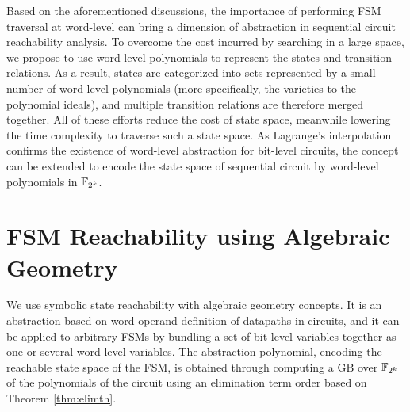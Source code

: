 Based on the aforementioned discussions, the importance of performing FSM traversal at word-level 
can bring a dimension of abstraction in sequential circuit reachability analysis.
To overcome the cost incurred by searching in a large space, we propose to use word-level 
polynomials to represent the states and transition relations. As a result, states are categorized into 
sets represented by a small number of word-level polynomials (more specifically, the varieties to the polynomial ideals),
and multiple transition relations are therefore merged together. All of these efforts reduce the cost of 
state space, meanwhile lowering the time complexity to traverse such a state space. As Lagrange's interpolation
confirms the existence of word-level abstraction for bit-level circuits, the concept
can be extended to encode the state space of sequential circuit by word-level polynomials in ${\mathbb{F}}_{2^k}$.

\section{FSM Reachability using Algebraic Geometry}
\label{sec:reach}
We use symbolic state reachability with algebraic
geometry concepts. It is an abstraction based on word operand
definition of datapaths in circuits, and it can be applied
to arbitrary FSMs by bundling a set of bit-level variables together as
one or several word-level variables.  The abstraction polynomial,
encoding the reachable state space of the FSM, is obtained through
computing a GB over ${\mathbb{F}}_{2^k}$ of the polynomials of the circuit using an
elimination term order based on Theorem \ref{thm:elimth}.  

